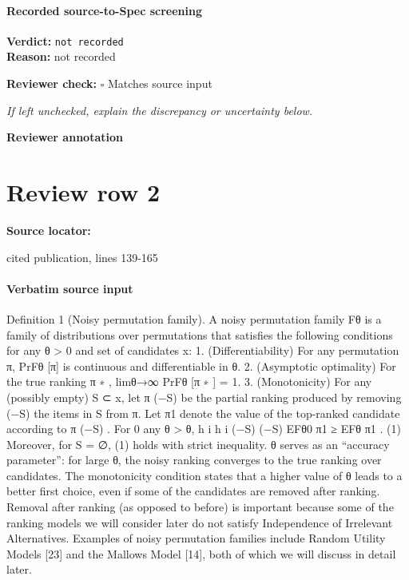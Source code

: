 \documentclass[10pt]{article}
\newcommand{\reviewerbox}{%
  \par\noindent\fbox{\parbox{0.96\linewidth}{\rule{0pt}{0.38in}}}\par
}
\newcommand{\reviewmatch}[1]{%
  \par\noindent\textbf{Reviewer check:} $\square$\; #1\par
  \noindent\emph{If left unchecked, explain the discrepancy or uncertainty below.}\par
}
\begin{document}
\paragraph{Recorded source-to-Spec screening}
\textbf{Verdict:} \texttt{not recorded}
\\
\textbf{Reason:} not recorded
\reviewmatch{Matches source input}
\noindent\textbf{Reviewer annotation}\par
\reviewerbox
\clearpage
\hypertarget{source-claim-fbe3ef1f5678507e}{}
\section*{Review row 2}
\textbf{Source locator:} {\footnotesize\raggedright cited publication, lines 139-\allowbreak{}165\par}
\paragraph{Verbatim source input}
\begin{ReviewVerbatim}
Definition 1 (Noisy permutation family). A noisy permutation family Fθ is a family of distributions over
permutations that satisfies the following conditions for any θ > 0 and set of candidates x:
1. (Differentiability) For any permutation π, PrFθ [π] is continuous and differentiable in θ.
2. (Asymptotic optimality) For the true ranking π ∗ , limθ→∞ PrFθ [π ∗ ] = 1.
3. (Monotonicity) For any (possibly empty) S ⊂ x, let π (−S) be the partial ranking produced by removing
(−S)
the items in S from π. Let π1
denote the value of the top-ranked candidate according to π (−S) . For
0
any θ > θ,
h
i
h
i
(−S)
(−S)
EFθ0 π1
≥ EFθ π1
.
(1)
Moreover, for S = ∅, (1) holds with strict inequality.
θ serves as an “accuracy parameter”: for large θ, the noisy ranking converges to the true ranking over
candidates. The monotonicity condition states that a higher value of θ leads to a better first choice, even
if some of the candidates are removed after ranking. Removal after ranking (as opposed to before) is
important because some of the ranking models we will consider later do not satisfy Independence of Irrelevant
Alternatives. Examples of noisy permutation families include Random Utility Models [23] and the Mallows
Model [14], both of which we will discuss in detail later.
\end{ReviewVerbatim}
\end{document}
